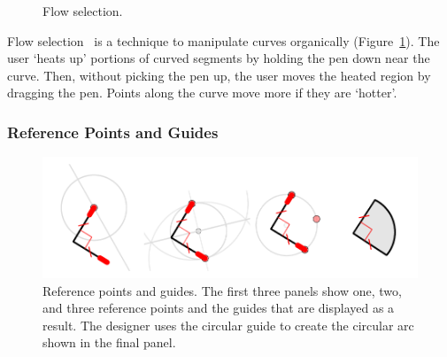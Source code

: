 \documentclass{article}
\begin{document}
\begin{figure}[h]
\centering {}
\hspace{3mm}
\caption{Flow selection.}
\label{fig:fs}
\end{figure}

Flow selection~\cite{johnson-flow-selection} is a technique to
manipulate curves organically (Figure~\ref{fig:fs}). The user `heats
up' portions of curved segments by holding the pen down near the
curve. Then, without picking the pen up, the user moves the heated
region by dragging the pen. Points along the curve move more if they
are `hotter'.


\subsubsection{Reference Points and Guides}

\begin{figure}[h]
  \centering
  \includegraphics[width=0.9\linewidth]{img/guides-all.pdf}
  \caption{Reference points and guides. The first three panels show
    one, two, and three reference points and the guides that are
    displayed as a result. The designer uses the circular guide to
    create the circular arc shown in the final panel.}
  \label{fig:guides}
\end{figure}
\end{document}
